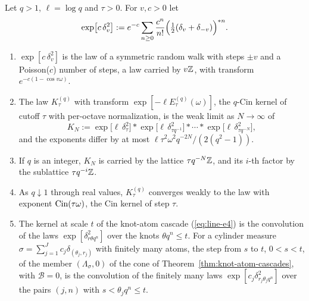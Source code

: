 \begin{proposition}
\label{prop:extreme-rays-random-walks}

Let $q > 1$, $\ell = \log q$ and $\tau > 0$. For $v, c > 0$ let
\begin{equation}\label{eq:line-e9}
  \exp\bigl[c\,\delta^2_v\bigr] := e^{-c}\sum_{n \ge 0}\frac{c^n}{n!}
  \Bigl(\tfrac12(\delta_v + \delta_{-v})\Bigr)^{*n}.
\end{equation}
\begin{enumerate}
\item $\exp[c\,\delta^2_v]$ is the law of a symmetric random walk with steps $\pm v$ and a
Poisson($c$) number of steps, a law carried by $v\mathbb{Z}$, with transform $e^{-c(1 - \cos v\omega)}$.
\item The law $K^{(q)}_\tau$ with transform $\exp[-\ell E^{(q)}_\tau(\omega)]$, the $q$-Cin kernel of
cutoff $\tau$ with per-octave normalization, is the weak limit as $N \to \infty$ of
\[
  K_N := \exp\bigl[\ell\,\delta^2_\tau\bigr] * \exp\bigl[\ell\,\delta^2_{\tau q^{-1}}\bigr] * \cdots *
  \exp\bigl[\ell\,\delta^2_{\tau q^{-N}}\bigr],
\]
and the exponents differ by at most $\ell\tau^2\omega^2q^{-2N}/(2(q^2 - 1))$.
\item If $q$ is an integer, $K_N$ is carried by the lattice $\tau q^{-N}\mathbb{Z}$, and its $i$-th factor
by the sublattice $\tau q^{-i}\mathbb{Z}$.
\item As $q \downarrow 1$ through real values, $K^{(q)}_\tau$ converges weakly to the law with
exponent $\operatorname{Cin}(\tau\omega)$, the Cin kernel of step $\tau$.
\item The kernel at scale $t$ of the knot-atom cascade (\ref{eq:line-e4}) is the convolution of the laws
$\exp[\delta^2_{r\theta q^n}]$ over the knots $\theta q^n \le t$. For a cylinder measure
$\sigma = \sum_{j=1}^Jc_j\delta_{(\theta_j, r_j)}$ with finitely many atoms, the step from $s$ to $t$,
$0 < s < t$, of the member $(\Lambda_\sigma, 0)$ of the cone of
Theorem~\ref{thm:knot-atom-cascades}, with $\mathcal{B} = 0$, is the convolution of the finitely
many laws $\exp[c_j\delta^2_{r_j\theta_jq^n}]$ over the pairs $(j, n)$
with $s < \theta_jq^n \le t$.
\end{enumerate}
\end{proposition}

